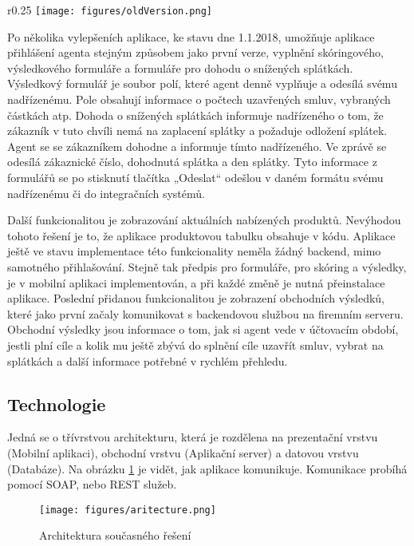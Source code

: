 \documentclass[11pt,twoside,a4paper]{book}
\begin{document}
\begin{wrapfigure}[15]{r}{0.25\textwidth}
    \centering
	\setlength\intextsep{0pt}
	\texttt{[image: figures/oldVersion.png]}
	\caption{Vylepšená aplikace}
    \label{fig:betterapp}
\end{wrapfigure}

Po několika vylepšeních aplikace, ke stavu dne 1.1.2018, umožňuje aplikace přihlášení agenta stejným způsobem jako první verze, vyplnění skóringového, výsledkového formuláře a formuláře pro dohodu o snížených splátkách. Výsledkový formulář je soubor polí, které agent denně vyplňuje a odesílá svému nadřízenému. Pole obsahují informace o počtech uzavřených smluv, vybraných částkách atp. Dohoda o snížených splátkách informuje nadřízeného o tom, že zákazník v tuto chvíli nemá na zaplacení splátky a požaduje odložení splátek. Agent se se zákazníkem dohodne a informuje tímto nadřízeného. Ve zprávě se odesílá zákaznické číslo, dohodnutá splátka a den splátky. Tyto informace z formulářů se po stisknutí tlačítka „Odeslat“ odešlou v daném formátu svému nadřízenému či do integračních systémů. 

Další funkcionalitou je zobrazování aktuálních nabízených produktů. Nevýhodou tohoto řešení je to, že aplikace produktovou tabulku obsahuje v kódu. Aplikace ještě ve stavu implementace této funkcionality neměla žádný backend, mimo samotného přihlašování. Stejně tak předpis pro formuláře, pro skóring a výsledky, je v mobilní aplikaci implementován, a při každé změně je nutná přeinstalace aplikace. Poslední přidanou funkcionalitou je zobrazení obchodních výsledků, které jako první začaly komunikovat s backendovou službou na firemním serveru. Obchodní výsledky jsou informace o tom, jak si agent vede v účtovacím období, jestli plní cíle a kolik mu ještě zbývá do splnění cíle uzavřít smluv, vybrat na splátkách a další informace potřebné v rychlém přehledu. 

\subsection{Technologie}
Jedná se o třívrstvou architekturu, která je rozdělena na prezentační vrstvu (Mobilní aplikaci), obchodní vrstvu (Aplikační server) a datovou vrstvu (Databáze). Na obrázku \ref{fig:architecture} je vidět, jak aplikace komunikuje. Komunikace probíhá pomocí SOAP, nebo REST služeb.

\begin{figure}[ht]
\begin{center}
\texttt{[image: figures/aritecture.png]}
\caption{Architektura současného řešení}
\label{fig:architecture}
\end{center}
\end{figure}
\end{document}
